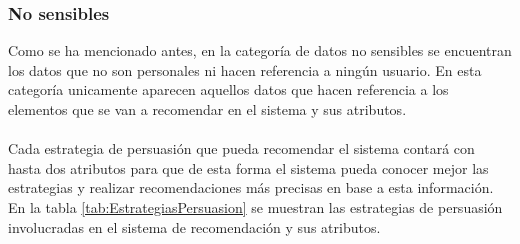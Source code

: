 \subsubsection{No sensibles}
Como se ha mencionado antes, en la categoría de datos no sensibles se encuentran los datos que no son personales ni hacen referencia a ningún usuario. En esta categoría unicamente aparecen aquellos datos que hacen referencia a los elementos que se van a recomendar en el sistema y sus atributos.
\\ \\
Cada estrategia de persuasión que pueda recomendar el sistema contará con hasta dos atributos para que de esta forma el sistema pueda conocer mejor las estrategias y realizar recomendaciones más precisas en base a esta información. En la tabla \ref{tab:EstrategiasPersuasion} se muestran las estrategias de persuasión involucradas en el sistema de recomendación y sus atributos.
